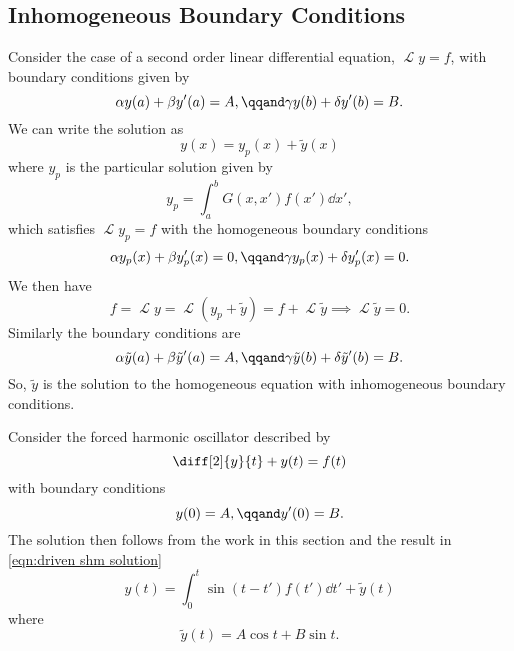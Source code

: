 \documentclass[fleqn]{NotesClass}
\DeclareMathOperator{\linop}{\mathcal{L}}
\begin{document}
    \subsection{Inhomogeneous Boundary Conditions}
    Consider the case of a second order linear differential equation, \(\linop y = f\), with boundary conditions given by
    \begin{equation}
        \alpha y(a) + \beta y'(a) = A, \qqand \gamma y(b) + \delta y'(b) = B.
    \end{equation}
    We can write the solution as
    \begin{equation}
        y(x) = y_{p}(x) + \tilde{y}(x)
    \end{equation}
    where \(y_p\) is the particular solution given by
    \begin{equation}
        y_p = \int_a^b G(x, x')f(x') \dd{x'},
    \end{equation}
    which satisfies \(\linop y_p = f\) with the homogeneous boundary conditions
    \begin{equation}
        \alpha y_p(x) + \beta y_p'(x) = 0, \qqand \gamma y_p(x) + \delta y_p'(x) = 0.
    \end{equation}
    We then have
    \begin{equation}
        f = \linop y = \linop (y_p + \tilde{y}) = f + \linop \tilde{y} \implies \linop \tilde{y} = 0.
    \end{equation}
    Similarly the boundary conditions are
    \begin{equation}
        \alpha \tilde{y}(a) + \beta \tilde{y}'(a) = A, \qqand \gamma \tilde{y}(b) + \delta \tilde{y}'(b) = B.
    \end{equation}
    So, \(\tilde{y}\) is the solution to the homogeneous equation with inhomogeneous boundary conditions.
    
    \begin{exm}{}{}
        Consider the forced harmonic oscillator described by
        \begin{equation}
            \diff[2]{y}{t} + y(t) = f(t)
        \end{equation}
        with boundary conditions
        \begin{equation}
            y(0) = A, \qqand y'(0) = B.
        \end{equation}
        The solution then follows from the work in this section and the result in \cref{eqn:driven shm solution}
        \begin{equation}
            y(t) = \int_{0}^{t} \sin(t - t') f(t') \dd{t'} + \tilde{y}(t)
        \end{equation}
        where
        \begin{equation}
            \tilde{y}(t) = A\cos t + B\sin t.
        \end{equation}
    \end{exm}
    
\end{document}
